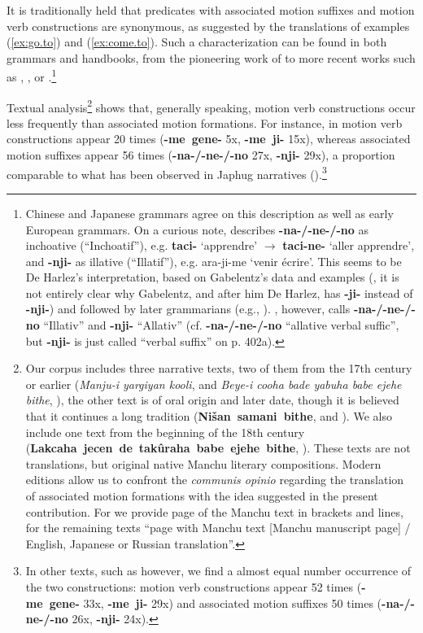 \documentclass{article}
\newcommand{\ipa}[1]{\textbf{{\phon\mbox{#1}}}} %
\begin{document}
It is traditionally held that predicates with associated motion suffixes and motion verb constructions are synonymous, as suggested by the translations of examples (\ref{ex:go.to}) and (\ref{ex:come.to}). Such a characterization can be found in both grammars and handbooks, from the pioneering work of \citet[163-165 §§133-134]{zaxarov10manchu} to more recent works such as \citet[34-35]{pashkov63manchu}, \citet[173-174]{avrorin00manchu},  \citet[19]{li00manchu} or \citet[239-240]{gorelova02manchu}.\footnote{Chinese and Japanese grammars agree on this description as well as early European grammars. On a curious note, \citet[51]{harlez84mandchou} describes \ipa{-na-/-ne-/-no} as inchoative (“Inchoatif”), e.g. \ipa{taci-} ‘apprendre’ $\rightarrow$ \ipa{taci-ne-} ‘aller apprendre’, and \ipa{-nji-} as illative (“Illatif”), e.g. ara-ji-me ‘venir écrire’. This seems to be De Harlez’s interpretation, based on Gabelentz’s data and examples (\citeyear[51]{gabelentz32mandchou}, it is not entirely clear why Gabelentz, and after him De Harlez, has \ipa{-ji-} instead of \ipa{-nji-}) and followed by later grammarians (e.g., \citet[367]{peeters40manjurische}). \citet[53]{haenisch61mandschu}, however, calls \ipa{-na-/-ne-/-no} “Illativ” and \ipa{-nji-} “Allativ” (cf.\citet[401b]{li00manchu} \ipa{-na-/-ne-/-no} “allative verbal suffic”, but \ipa{-nji-} is just called “verbal suffix” on p. 402a).}

Textual analysis\footnote{Our corpus includes three narrative texts, two of them from the 17th century or earlier (\textit{Manju-i yargiyan kooli}, \citealt{shunjuu92yargiyan} and \textit{Beye-i cooha bade yabuha babe ejehe bithe}, \citealt{cosmo06dzengseo}), the other text is of oral origin and later date, though it is believed that it continues a long tradition (\ipa{Nišan samani bithe}, \citealt{nowak77nisan} and \citealt{jaxontov93nisan}). We also include one text from the beginning of the 18th century (\ipa{Lakcaha jecen de takûraha babe ejehe bithe}, \citealt{shunjuu64tulishen}). These texts are not translations, but original native Manchu literary compositions. Modern editions allow us to confront the \textit{communis opinio} regarding the translation of associated motion formations with the idea suggested in the present contribution. For \citet{shunjuu92yargiyan} we provide page of the Manchu text in brackets and lines, for the remaining texts “page with Manchu text [Manchu manuscript page] / English, Japanese or Russian translation”.} shows that, generally speaking, motion verb constructions occur less frequently than associated motion formations. For instance, in \citet{cosmo06dzengseo} motion verb constructions appear 20 times (\ipa{-me gene-} 5x, \ipa{-me ji-} 15x), whereas associated motion suffixes appear 56 times (\ipa{-na-/-ne-/-no} 27x, \ipa{-nji-} 29x), a proportion comparable to what has been observed in Japhug narratives (\citealt[209]{jacques13harmonization}).\footnote{In other texts, such as \citealt{jaxontov93nisan} however, we find a almost equal number occurrence of the two constructions:  motion verb constructions appear 52 times (\ipa{-me gene-} 33x, \ipa{-me ji-} 29x) and associated motion suffixes 50 times (\ipa{-na-/-ne-/-no} 26x, \ipa{-nji-} 24x).}
\end{document}
